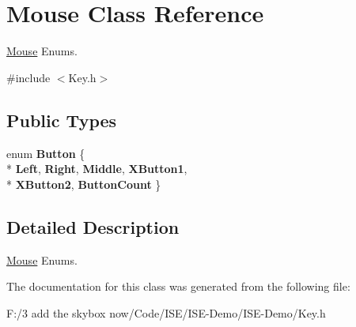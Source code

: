\hypertarget{class_mouse}{\section{Mouse Class Reference}
\label{class_mouse}
}


\hyperlink{class_mouse}{Mouse} Enums.  




{\ttfamily \#include $<$Key.\-h$>$}

\subsection*{Public Types}
\begin{DoxyCompactItemize}
\item 
enum {\bfseries Button} \{ \\*
{\bfseries Left}, 
{\bfseries Right}, 
{\bfseries Middle}, 
{\bfseries X\-Button1}, 
\\*
{\bfseries X\-Button2}, 
{\bfseries Button\-Count}
 \}
\end{DoxyCompactItemize}


\subsection{Detailed Description}
\hyperlink{class_mouse}{Mouse} Enums. 

The documentation for this class was generated from the following file\-:\begin{DoxyCompactItemize}
\item 
F\-:/3 add the skybox now/\-Code/\-I\-S\-E/\-I\-S\-E-\/\-Demo/\-I\-S\-E-\/\-Demo/Key.\-h\end{DoxyCompactItemize}
